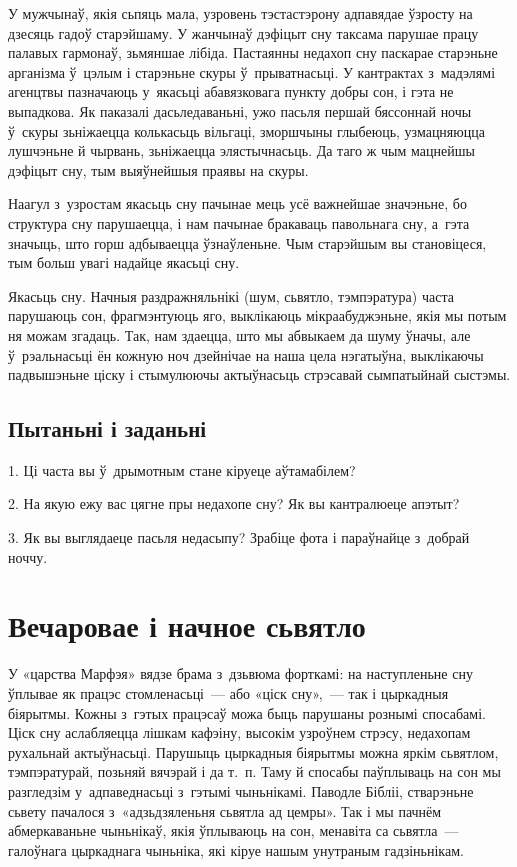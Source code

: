 У мужчынаў, якія сьпяць мала, узровень тэстастэрону адпавядае ўзросту на дзесяць гадоў старэйшаму. У жанчынаў дэфіцыт сну таксама парушае працу палавых гармонаў, зьмяншае лібіда. Пастаянны недахоп сну паскарае старэньне арганізма ў~цэлым і старэньне скуры ў~прыватнасьці. У кантрактах з~мадэлямі агенцтвы пазначаюць у~якасьці абавязковага пункту добры сон, і гэта не выпадкова. Як паказалі дасьледаваньні, ужо пасьля першай бяссоннай ночы ў~скуры зьніжаецца колькасьць вільгаці, зморшчыны глыбеюць, узмацняюцца лушчэньне й чырвань, зьніжаецца элястычнасьць. Да таго ж чым мацнейшы дэфіцыт сну, тым выяўнейшыя праявы на скуры.

Наагул з~узростам якасьць сну пачынае мець усё важнейшае значэньне, бо структура сну парушаецца, і нам пачынае бракаваць павольнага сну, а~гэта значыць, што горш адбываецца ўзнаўленьне. Чым старэйшым вы становіцеся, тым больш увагі надайце якасьці сну.

Якасьць сну. Начныя раздражняльнікі (шум, сьвятло, тэмпэратура) часта парушаюць сон, фрагмэнтуюць яго, выклікаюць мікраабуджэньне, якія мы потым ня можам згадаць. Так, нам здаецца, што мы абвыкаем да шуму ўначы, але ў~рэальнасьці ён кожную ноч дзейнічае на наша цела нэгатыўна, выклікаючы падвышэньне ціску і стымулюючы актыўнасьць стрэсавай сымпатыйнай сыстэмы.

\subsection*{Пытаньні і заданьні}

1. Ці часта вы ў~дрымотным стане кіруеце аўтамабілем?

2. На якую ежу вас цягне пры недахопе сну? Як вы кантралюеце апэтыт?

3. Як вы выглядаеце пасьля недасыпу? Зрабіце фота і параўнайце з~добрай ноччу.


\section{Вечаровае і начное сьвятло}

У «царства Марфэя» вядзе брама з~дзьвюма форткамі: на наступленьне сну ўплывае як працэс стомленасьці~--- або «ціск сну»,~--- так і цыркадныя біярытмы. Кожны з~гэтых працэсаў можа быць парушаны рознымі спосабамі. Ціск сну аслабляецца лішкам кафэіну, высокім узроўнем стрэсу, недахопам рухальнай актыўнасьці. Парушыць цыркадныя біярытмы можна яркім сьвятлом, тэмпэратурай, позьняй вячэрай і да т.~п. Таму й спосабы паўплываць на сон мы разгледзім у~адпаведнасьці з~гэтымі чыньнікамі. Паводле Бібліі, стварэньне сьвету пачалося з~«адзьдзяленьня сьвятла ад цемры». Так і мы пачнём абмеркаваньне чыньнікаў, якія ўплываюць на сон, менавіта са сьвятла~--- галоўнага цыркаднага чыньніка, які кіруе нашым унутраным гадзіньнікам.

